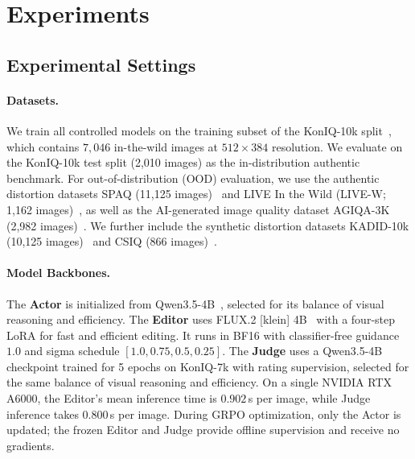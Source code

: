 \documentclass[letterpaper]{article} %
\begin{document}
\section{Experiments}
\label{sec:experiments}

\subsection{Experimental Settings}
\label{sec:experimental-settings}

\paragraph{Datasets.}
We train all controlled models on the training subset of
the KonIQ-10k split~\citep{koniq}, which contains $7{,}046$
in-the-wild images at $512{\times}384$ resolution. We evaluate on the
KonIQ-10k test split (2,010 images) as the in-distribution authentic benchmark.
For out-of-distribution (OOD) evaluation, we use the authentic distortion
datasets SPAQ (11,125 images)~\citep{spaq} and LIVE In the Wild
(LIVE-W; 1,162 images)~\citep{live-w}, as well as the AI-generated image
quality dataset AGIQA-3K (2,982 images)~\citep{agiqa}. We further include the
synthetic distortion datasets KADID-10k (10,125 images)~\citep{kadid} and CSIQ
(866 images)~\citep{csiq}.

\paragraph{Model Backbones.}
The \textbf{Actor} is initialized from Qwen3.5-4B~\citep{qwen35}, selected for
its balance of visual reasoning and efficiency. The \textbf{Editor} uses
FLUX.2 [klein] 4B~\citep{flux2} with a four-step LoRA for fast and efficient
editing. It runs in BF16 with classifier-free guidance $1.0$ and sigma schedule
$[1.0,0.75,0.5,0.25]$. The \textbf{Judge} uses a Qwen3.5-4B checkpoint trained
for 5 epochs on KonIQ-7k with rating supervision, selected for the same balance
of visual reasoning and efficiency. On a single NVIDIA RTX A6000, the Editor's
mean inference time is $0.902$\,s per image, while Judge inference takes $0.800$\,s per image.
During GRPO optimization, only the Actor is updated; the frozen Editor and
Judge provide offline supervision and receive no gradients.
\end{document}
